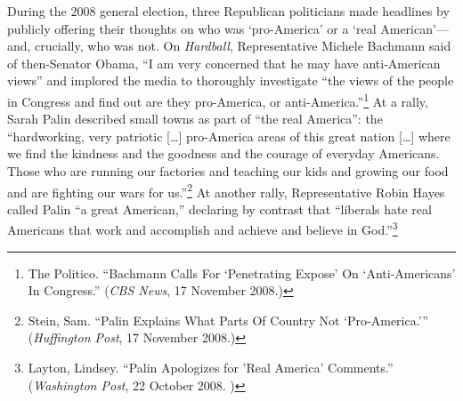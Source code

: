 During the 2008 general election, three Republican politicians made
headlines by publicly offering their thoughts on who was `pro-America'
or a `real American'---and, crucially, who was not. On \emph{Hardball},
Representative Michele Bachmann said of then-Senator Obama, ``I am very
concerned that he may have anti-American views'' and implored the media
to thoroughly investigate ``the views of the people in Congress and find
out are they pro-America, or anti-America.''\footnote{The Politico.
  ``Bachmann Calls For `Penetrating Expose' On `Anti-Americans' In
  Congress.'' (\emph{CBS News}, 17 November 2008.)}
At a rally, Sarah Palin described small towns as part of ``the real
America'': the ``hardworking, very patriotic {[}\ldots{}{]} pro-America
areas of this great nation {[}\ldots{}{]} where we find the kindness and
the goodness and the courage of everyday Americans. Those who are
running our factories and teaching our kids and growing our food and are
fighting our wars for us.''\footnote{Stein, Sam. ``Palin Explains What
  Parts Of Country Not `Pro-America.''' (\emph{Huffington Post}, 17
  November 2008.)}
At another rally, Representative Robin Hayes called Palin ``a great
American,'' declaring by contrast that ``liberals hate real Americans
that work and accomplish and achieve and believe in God.''\footnote{Layton,
  Lindsey. ``Palin Apologizes for 'Real America' Comments.'' (\textit{Washington Post}, 22 October 2008.
)}

